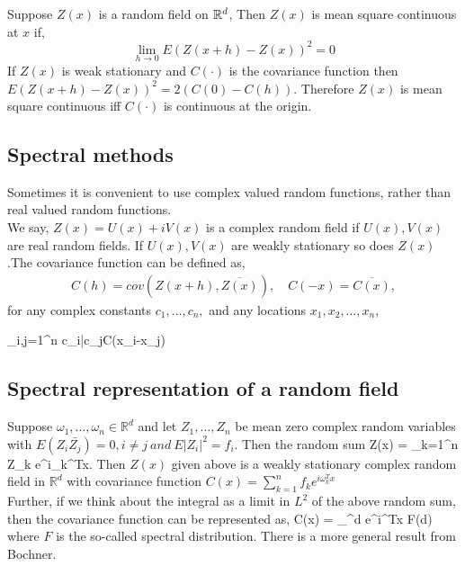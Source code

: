 Suppose $Z(x)$ is a random field on $\mathbb{R}^d$, Then $Z(x)$ is mean square continuous at $x$ if, $$\lim_{h\to 0} E(Z(x+h)-Z(x))^2 =0$$
If $Z(x)$ is weak stationary and $C(\cdot)$ is the covariance function then $E(Z(x+h)-Z(x))^2=2(C(0)-C(h))$. Therefore $Z(x)$ is mean square continuous iff $C(\cdot)$ is continuous at the origin.

\subsection{Spectral methods} 

Sometimes it is convenient to use complex valued random functions, rather than real valued random functions. \\

We say, $Z(x)=U(x) + i V(x)$ is a complex random field if $U(x),V(x)$ are real random fields. If $U(x),V(x)$ are weakly stationary so does $Z(x)$.The covariance function can be defined as,
\begin{eqnarray*}
	C(h) = cov(Z(x+h), \overline{Z(x)}), \quad C(-x)=\overline{C(x)},
\end{eqnarray*}
for any complex constants $c_1,\ldots, c_n,$ and any locations $x_1, x_2, \ldots, x_n$,

\beq \sum_{i,j=1}^n c_i\bar{c_j}C(x_i-x_j)\eeq

\subsection{Spectral representation of a random field}

Suppose $\omega_1,\ldots, \omega_n \in \mathbb{R}^d$ and let $Z_1, \ldots, Z_n$ be mean zero complex random variables with  $E(Z_i\bar{Z_j})=0, i\ne j\ and\ E|Z_i|^2=f_i$. Then the random sum
\beq Z(x) = \sum_{k=1}^n Z_k e^{i\omega_k^Tx}.\eeq
Then $Z(x)$ given above is a weakly stationary complex random field in $\mathbb{R}^d$ with covariance function $C(x) = \sum_{k=1}^n f_k e^{i\omega_k^Tx}$\\

Further, if we think about the integral as a limit in $L^2$ of the above random sum, then the covariance function can be represented as,
\beq C(x) = \int_{^d} e^{i\omega^Tx} F(d\omega)\eeq
where $F$ is the so-called spectral distribution. There is a more general result from Bochner.

